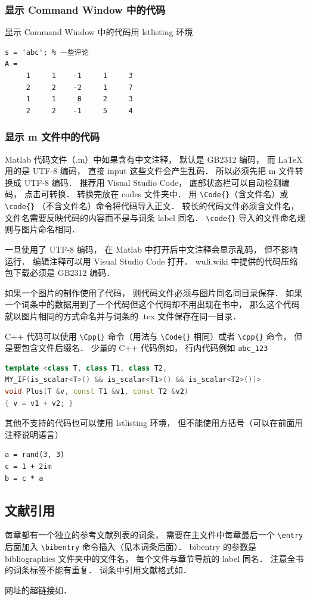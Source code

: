 \subsubsection{显示  Command Window 中的代码}
显示  Command Window 中的代码用 lstlisting 环境
\begin{lstlisting}[language=MatlabCom]
s = 'abc'; % 一些评论
A =
     1     1    -1     1     3
     2     2    -2     1     7
     1     1     0     2     3
     2     2    -1     5     4
\end{lstlisting}

\subsubsection{显示 m 文件中的代码}

Matlab 代码文件（.m）中如果含有中文注释， 默认是 GB2312 编码， 而 LaTeX 用的是 UTF-8 编码， 直接 input 这些文件会产生乱码． 所以必须先把 m 文件转换成 UTF-8 编码． 推荐用 Visual Studio Code， 底部状态栏可以自动检测编码， 点击可转换． 转换完放在 codes 文件夹中． 用 \lstinline|\Code{}|（含文件名）或  \lstinline|\code{}| （不含文件名）命令将代码导入正文． 较长的代码文件必须含文件名， 文件名需要反映代码的内容而不是与词条 label 同名． \lstinline|\code{}| 导入的文件命名规则与图片命名相同．

一旦使用了 UTF-8 编码， 在 Matlab 中打开后中文注释会显示乱码， 但不影响运行． 编辑注释可以用 Visual Studio Code 打开． wuli.wiki 中提供的代码压缩包下载必须是 GB2312 编码．

如果一个图片的制作使用了代码， 则代码文件必须与图片同名同目录保存． 如果一个词条中的数据用到了一个代码但这个代码却不用出现在书中， 那么这个代码就以图片相同的方式命名并与词条的 .tex 文件保存在同一目录． 


C++ 代码可以使用 \lstinline|\Cpp{}| 命令（用法与 \lstinline|\Code{}| 相同）或者 \lstinline|\cpp{}| 命令， 但是要包含文件后缀名． 少量的 C++ 代码例如， 行内代码例如 \lstinline|abc_123|
\begin{lstlisting}[language=cpp]
template <class T, class T1, class T2,
MY_IF(is_scalar<T>() && is_scalar<T1>() && is_scalar<T2>())>
void Plus(T &v, const T1 &v1, const T2 &v2)
{ v = v1 + v2; }
\end{lstlisting}

其他不支持的代码也可以使用 lstlisting 环境， 但不能使用方括号（可以在前面用注释说明语言）
\begin{lstlisting}
a = rand(3, 3)
c = 1 + 2im
b = c * a
\end{lstlisting}


\subsection{文献引用}
每章都有一个独立的参考文献列表的词条， 需要在主文件中每章最后一个 \lstinline|\entry| 后面加入 \lstinline|\bibentry| 命令插入（见本词条后面）． bibentry 的参数是 bibliographies 文件夹中的文件名， 每个文件与章节导航的 label 同名． 注意全书的词条标签不能有重复． 词条中引用文献格式如\cite{PhysWiki}\cite{PhysWikiEng}．

网址的超链接如．

